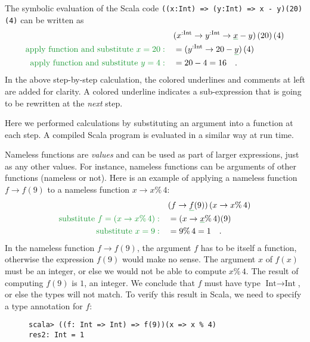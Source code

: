 The symbolic evaluation of the Scala code \lstinline!((x:Int) => (y:Int) => x - y)(20)(4)!
can be written as
\begin{align*}
 & (x^{:\text{Int}}\rightarrow y^{:\text{Int}}\rightarrow\gunderline x-y)\left(20\right)\left(4\right)\\
{\color{greenunder}\text{apply function and substitute }x=20:}\quad & =(y^{:\text{Int}}\rightarrow20-\gunderline y)\left(4\right)\\
{\color{greenunder}\text{apply function and substitute }y=4:}\quad & =20-4=16\quad.
\end{align*}
In the above step-by-step calculation, the colored underlines and
comments at left are added for clarity. A colored underline indicates
a sub-expression that is going to be rewritten at the \emph{next}
step.

Here we performed calculations by substituting an argument into a
function at each step. A compiled Scala program is evaluated in a
similar way at run time.

Nameless functions are \emph{values} and can be used as part of larger
expressions, just as any other values. For instance, nameless functions
can be arguments of other functions (nameless or not). Here is an
example of applying a nameless function $f\rightarrow f(9)$ to a
nameless function $x\rightarrow x\%\,4$:
\begin{align*}
 & (f\rightarrow\gunderline f(9))\left(x\rightarrow x\%\,4\right)\\
{\color{greenunder}\text{substitute }f=\left(x\rightarrow x\%\,4\right):}\quad & =(x\rightarrow\gunderline x\%\,4)(9)\\
{\color{greenunder}\text{substitute }x=9:}\quad & =9\%\,4=1\quad.
\end{align*}
In the nameless function $f\rightarrow f(9)$, the argument $f$ has
to be itself a function, otherwise the expression $f(9)$ would make
no sense. The argument $x$ of $f(x)$ must be an integer, or else
we would not be able to compute $x\%\,4$. The result of computing
$f(9)$ is $1$, an integer. We conclude that $f$ must have type
$\text{Int}\rightarrow\text{Int}$, or else the types will not match.
To verify this result in Scala, we need to specify a type annotation
for $f$:

\begin{wrapfigure}{l}{0.45\columnwidth}%
\vspace{-0.75\baselineskip}
\begin{lstlisting}
scala> ((f: Int => Int) => f(9))(x => x % 4)
res2: Int = 1
\end{lstlisting}
\vspace{-0.75\baselineskip}
\end{wrapfigure}%

